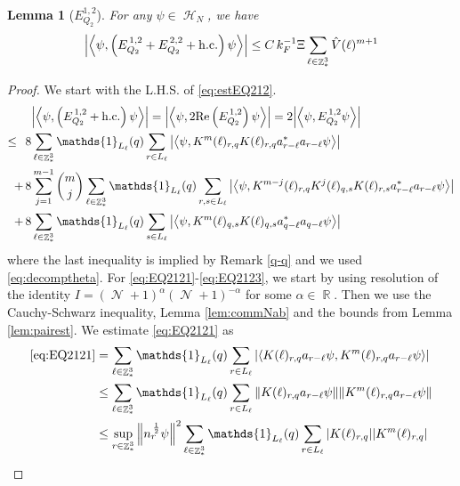 \documentclass[sn-mathphys, Numbered ,a4paper]{sn-jnl}%
\DeclareMathOperator{\R}{\mathbb{R}}
\DeclareMathOperator{\Z}{\mathbb{Z}}
\DeclareMathOperator{\HH}{\mathcal{H}}
\DeclareMathOperator{\NN}{\mathcal{N}}
\newcommand{\half}{\frac{1}{2}}
\newcommand{\eva}[1]{\left\langle #1 \right\rangle}
\theoremstyle{plain}
\newtheorem{lemma}[theorem]{Lemma}
\theoremstyle{definition}
\theoremstyle{remark}
\theoremstyle{plain}
\theoremstyle{definition}
\theoremstyle{remark}
\begin{document}
\begin{lemma}[$E_{Q_2}^{1,2}$]
    For any $\psi \in \HH_N$, we have
    \begin{alignat}{2}
    \abs{\eva{\psi,\left(E^{\,1,2}_{Q_2}+E^{\,2,2}_{Q_2}+\mathrm{h.c.}\right) \psi }}
   	\leq   C\, k_{F}^{-1} \Xi \sum\limits_{\ell \in \Z^3_*} \hat{V}(\ell)^{m+1} \label{eq:estEQ212}
    \end{alignat}
\end{lemma}
\begin{proof}
     We start with the L.H.S. of \eqref{eq:estEQ212}.
    \begin{align}
    	&\abs{\eva{\psi,\left(E^{\,1,2}_{Q_2}+\mathrm{h.c.}\right) \psi }} = \abs{\eva{\psi,2\mathrm{Re}\left(E^{\,1,2}_{Q_2}\right) \psi }} = 2\abs{\eva{\psi, E^{\,1,2}_{Q_2} \psi }}\nonumber\\
    	\leq\,\;8& \sum\limits_{\ell\in \Z^3_*} \mathds{1}_{L_{\ell}}(q) \sum\limits_{r\in L_{\ell}} \abs{\eva{\psi, K^m(\ell)_{r,q} K(\ell)_{r,q} a^*_{r-\ell} a_{r-\ell} \psi }}\label{eq:EQ2121}\\
    	+\,8& \sum\limits_{j=1}^{m-1} {{m}\choose j} \sum\limits_{\ell \in \Z^3_*}\mathds{1}_{L_{\ell}}(q) \sum\limits_{r,s\in L_{\ell}}  \abs{\eva{\psi, K^{m-j}(\ell)_{r,q} K^{j}(\ell)_{q,s} K(\ell)_{r,s} a^*_{r-\ell} a_{r-\ell} \psi }} \label{eq:EQ2122}\\
    	+\,8&\sum\limits_{\ell \in \Z^3_*} \mathds{1}_{L_{\ell}}(q) \sum\limits_{ s \in L_{\ell}} \abs{\eva{\psi, K^m(\ell)_{q,s} K(\ell)_{q,s} a^*_{q-\ell} a_{q-\ell} \psi }}\label{eq:EQ2123}
    \end{align}
    where the last inequality is implied by Remark \ref{q-q} and we used \eqref{eq:decomptheta}.
    For \eqref{eq:EQ2121}-\eqref{eq:EQ2123}, we start by using resolution of the identity $I = (\NN+1)^{\alpha}(\NN+1)^{-\alpha}$ for some $\alpha \in \R$. Then we use the Cauchy-Schwarz inequality, Lemma \ref{lem:commNab} and the bounds from Lemma \ref{lem:pairest}.
    We estimate \eqref{eq:EQ2121} as 
\begin{align}
    \eqref{eq:EQ2121}
    &= \sum\limits_{\ell \in \Z^3_*} \mathds{1}_{L_{\ell}}(q) \sum\limits_{r\in L_{\ell}} \abs{\eva{ K(\ell)_{r,q} a_{r-\ell} \psi, K^m(\ell)_{r,q}  a_{r-\ell} \psi }}\nonumber\\
    &\leq \sum\limits_{\ell \in \Z^3_*} \mathds{1}_{L_{\ell}}(q) \sum\limits_{r\in L_{\ell}} \norm{ K(\ell)_{r,q} a_{r-\ell} \psi}\norm{ K^m(\ell)_{r,q}  a_{r-\ell} \psi }\nonumber\\
	&\leq \sup\limits_{r\in \Z^3_*} \norm{n_r^{\,\half}\psi}^2 \sum\limits_{\ell \in \Z^3_*} \mathds{1}_{L_{\ell}}(q) \sum\limits_{r\in L_{\ell}} \abs{ K(\ell)_{r,q} } \abs{ K^m(\ell)_{r,q} }\nonumber\\

\end{align}
\end{proof}
\end{document}
